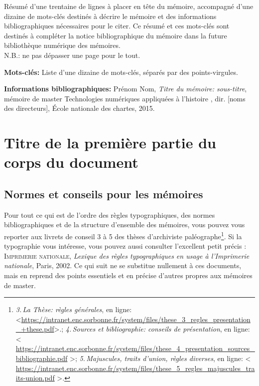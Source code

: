 \documentclass[a4paper,12pt]{book}
\begin{document}
 Résumé d'une trentaine de lignes à placer en tête du mémoire, accompagné d'une dizaine de mots-clés destinés à décrire le mémoire et des informations bibliographiques nécessaires pour le citer. Ce résumé et ces mots-clés sont destinés à compléter la notice bibliographique du mémoire dans la future bibliothèque numérique des mémoires.\\
N.B.: ne pas dépasser une page pour le tout.

\medskip

\textbf{Mots-clés:} Liste d'une dizaine de mots-clés, séparés par des points-virgules.

\textbf{Informations bibliographiques:} Prénom Nom, \textit{Titre du mémoire: sous-titre}, mémoire de master \og Technologies numériques appliquées à l'histoire \fg{}, dir. [noms des directeurs], École nationale des chartes, 2015.

\clearpage
\thispagestyle{empty}
\cleardoublepage

\mainmatter

\part{Titre de la première partie du corps du document}

\chapter{Normes et conseils pour les mémoires}

Pour tout ce qui est de l'ordre des règles typographiques, des normes bibliographiques et de la structure d'ensemble des mémoires, vous pouvez vous reporter aux livrets de conseil 3 à 5 des thèses d'archiviste paléographe\footnote{%
\textit{3.\,La Thèse: règles générales}, en ligne: <\url{https://intranet.enc.sorbonne.fr/system/files/these_3_regles_presentation_+these.pdf}>.;
\textit{4.\,Sources et bibliographie: conseils de présentation}, en ligne: < \url{https://intranet.enc.sorbonne.fr/system/files/these_4_presentation_sources_bibliographie.pdf}
>;
\textit{5.\,Majuscules, traits d'union, règles diverses}, en ligne: < \url{https://intranet.enc.sorbonne.fr/system/files/these_5_regles_majuscules_traits-union.pdf}
>.
}.
Si la typographie vous intéresse, vous pouvez aussi consulter  l'excellent petit  précis :
\textsc{Imprimerie nationale}, \textit{Lexique des règles typographiques en usage à l'Imprimerie nationale}, Paris, 2002. 
Ce qui suit ne se substitue nullement à ces documents, mais en reprend des points essentiels et en précise d'autres propres aux mémoires de master.
\end{document}
